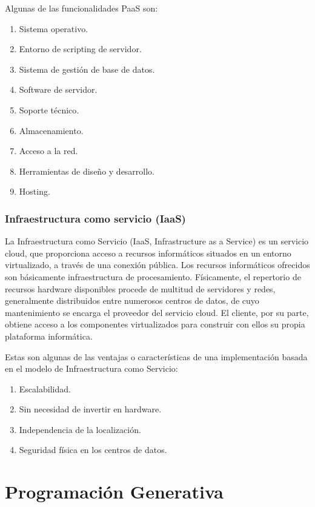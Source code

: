 \documentclass[a4paper,11pt]{book}
\begin{document}
Algunas de las funcionalidades PaaS son:

\begin{enumerate}
\item Sistema operativo.
\item Entorno de scripting de servidor.
\item Sistema de gestión de base de datos.
\item Software de servidor.
\item Soporte técnico.
\item Almacenamiento.
\item Acceso a la red.
\item Herramientas de diseño y desarrollo.
\item Hosting.
\end{enumerate}

\subsubsection{Infraestructura como servicio (IaaS)}

La Infraestructura como Servicio\cite{iaas} (IaaS, Infrastructure as a Service) es un servicio cloud, que proporciona acceso a recursos informáticos situados en un entorno virtualizado, a través de una conexión pública. Los recursos informáticos ofrecidos  son básicamente infraestructura de procesamiento. Físicamente, el repertorio de recursos hardware disponibles procede de multitud de servidores y redes, generalmente distribuidos entre numerosos centros de datos, de cuyo mantenimiento se encarga el proveedor del servicio cloud. El cliente, por su parte, obtiene acceso a los componentes virtualizados para construir con ellos su propia plataforma informática.

Estas son algunas de las ventajas o características de una implementación basada en el modelo de Infraestructura como Servicio:

\begin{enumerate}
\item Escalabilidad.
\item Sin necesidad de invertir en hardware.
\item Independencia de la localización.
\item Seguridad física en los centros de datos.
\end{enumerate}

\section{Programación Generativa}
\end{document}
